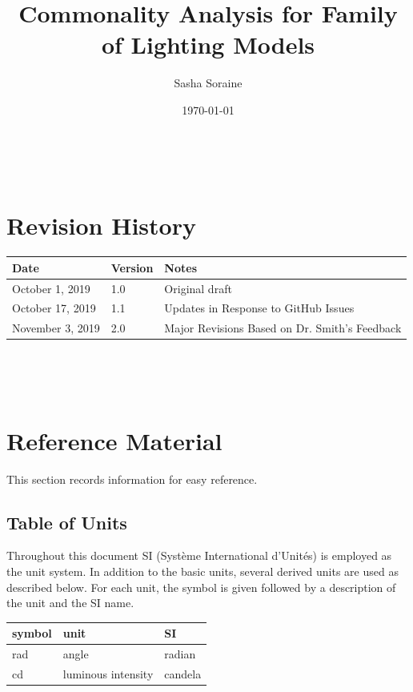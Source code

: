 \documentclass[12pt]{article}
\newcommand{\famname}{Family of Lighting Models} %
\begin{document}
\title{Commonality Analysis for \famname} %
\author{Sasha Soraine}
\date{\today}

\maketitle

~\newpage


\section{Revision History}

\begin{tabularx}{\textwidth}{p{3cm}p{2cm}X}
\toprule {\bf Date} & {\bf Version} & {\bf Notes}\\
\midrule
October 1, 2019 & 1.0 & Original draft\\
October 17, 2019 & 1.1 & Updates in Response to GitHub Issues \\
November 3, 2019 & 2.0 & Major Revisions Based on Dr. Smith's Feedback\\
\bottomrule
\end{tabularx}

~\newpage
	
\tableofcontents

~\newpage



\section{Reference Material}

This section records information for easy reference.

\subsection{Table of Units}

Throughout this document SI (Syst\`{e}me International d'Unit\'{e}s) is employed
as the unit system.  In addition to the basic units, several derived units are
used as described below.  For each unit, the symbol is given followed by a
description of the unit and the SI name.
~\newline

\renewcommand{\arraystretch}{1.2}
\noindent \begin{tabular}{l l l} 
	\toprule		
	\textbf{symbol} & \textbf{unit} & \textbf{SI}\\
	\midrule 
	\si{\radian} & angle & radian\\
	\si{cd} & luminous intensity & candela\\	
	\bottomrule
\end{tabular}
\end{document}
